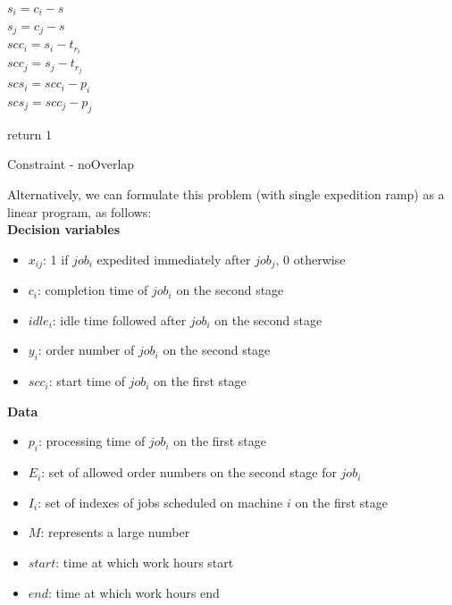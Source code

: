 \documentclass{ctuthesis}
\begin{document}
\label{overlap}
\begin{algorithm}[H]
\SetAlgoLined
{}

$s_i = c_i - s\;$\\
$s_j = c_j - s\;$\\
$scc_i = s_i - t_{r_i}\;$\\
$scc_j = s_j - t_{r_j}\;$\\

$scs_i = scc_i - p_i\;$\\
$scs_j = scc_j - p_j\;$



return $1\;$
 \caption{Constraint - noOverlap}
\end{algorithm}

Alternatively, we can formulate this problem (with single expedition ramp) as a linear program, as follows:\\
\textbf{Decision variables}

\begin{itemize}
\item $x_{ij}$: 1 if $job_i$ expedited immediately after $job_j$, 0 otherwise
\item$c_i$: completion time of $job_i$ on the second stage
\item$idle_i$: idle time followed after $job_i$ on the second stage
\item$y_i$: order number of $job_i$ on the second stage
\item$scc_i$: start time of $job_i$ on the first stage 
\end{itemize}
\textbf{Data}
\begin{itemize}
\item$p_i$: processing time of $job_i$ on the first stage
\item$E_i$: set of allowed order numbers on the second stage for $job_i$
\item$I_i$: set of indexes of jobs scheduled on machine $i$ on the first stage
\item$M$: represents a large number
\item$start$: time at which work hours start
\item$end$: time at which work hours end
\end{itemize}
\end{document}
